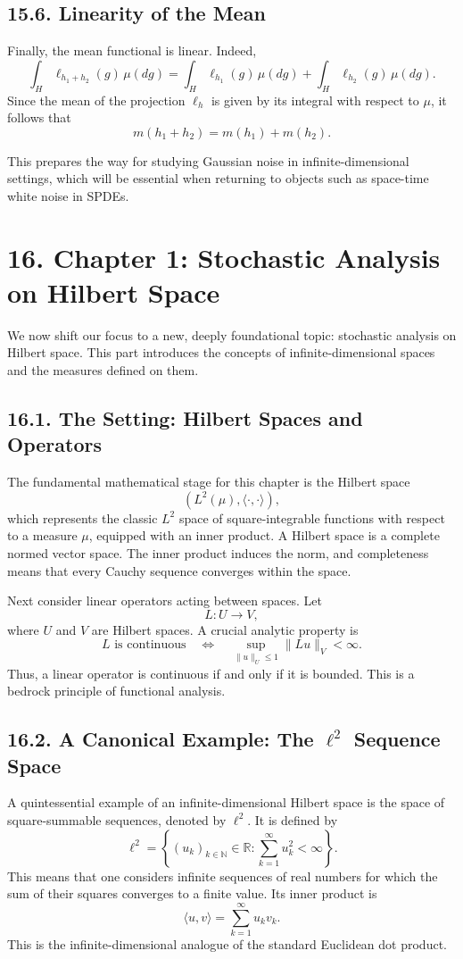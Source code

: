 \documentclass[11pt]{article}
\theoremstyle{definition}
\theoremstyle{remark}
\begin{document}
\subsection*{15.6. Linearity of the Mean}
Finally, the mean functional is linear. Indeed,
\[
\int_H \ell_{h_1+h_2}(g)\,\mu(dg)=\int_H \ell_{h_1}(g)\,\mu(dg)+\int_H \ell_{h_2}(g)\,\mu(dg).
\]
Since the mean of the projection $\ell_h$ is given by its integral with respect to $\mu$, it follows that
\[
m(h_1+h_2)=m(h_1)+m(h_2).
\]

This prepares the way for studying Gaussian noise in infinite-dimensional settings, which will be essential when returning to objects such as space-time white noise in SPDEs.

\section*{16. Chapter 1: Stochastic Analysis on Hilbert Space}
We now shift our focus to a new, deeply foundational topic: stochastic analysis on Hilbert space. This part introduces the concepts of infinite-dimensional spaces and the measures defined on them.

\subsection*{16.1. The Setting: Hilbert Spaces and Operators}
The fundamental mathematical stage for this chapter is the Hilbert space
\[
(L^2(\mu),\langle\cdot,\cdot\rangle),
\]
which represents the classic $L^2$ space of square-integrable functions with respect to a measure $\mu$, equipped with an inner product. A Hilbert space is a complete normed vector space. The inner product induces the norm, and completeness means that every Cauchy sequence converges within the space.

Next consider linear operators acting between spaces. Let
\[
L:U\to V,
\]
where $U$ and $V$ are Hilbert spaces. A crucial analytic property is
\[
L \text{ is continuous}
\quad\Longleftrightarrow\quad
\sup_{\|u\|_U\le 1}\|Lu\|_V<\infty.
\]
Thus, a linear operator is continuous if and only if it is bounded. This is a bedrock principle of functional analysis.

\subsection*{16.2. A Canonical Example: The $\ell^2$ Sequence Space}
A quintessential example of an infinite-dimensional Hilbert space is the space of square-summable sequences, denoted by $\ell^2$. It is defined by
\[
\ell^2=\left\{(u_k)_{k\in\mathbb N}\in\mathbb R:\sum_{k=1}^{\infty}u_k^2<\infty\right\}.
\]
This means that one considers infinite sequences of real numbers for which the sum of their squares converges to a finite value. Its inner product is
\[
\langle u,v\rangle=\sum_{k=1}^{\infty}u_kv_k.
\]
This is the infinite-dimensional analogue of the standard Euclidean dot product.
\end{document}

